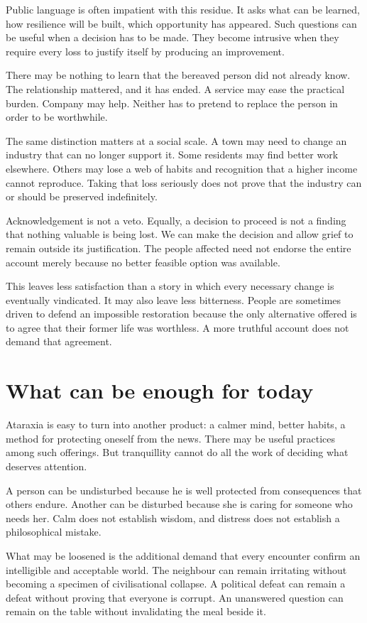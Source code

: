 \documentclass[12pt,a4paper]{book}
\begin{document}
Public language is often impatient with this residue. It asks what can be learned, how resilience will be built, which opportunity has appeared. Such questions can be useful when a decision has to be made. They become intrusive when they require every loss to justify itself by producing an improvement.

There may be nothing to learn that the bereaved person did not already know. The relationship mattered, and it has ended. A service may ease the practical burden. Company may help. Neither has to pretend to replace the person in order to be worthwhile.

The same distinction matters at a social scale. A town may need to change an industry that can no longer support it. Some residents may find better work elsewhere. Others may lose a web of habits and recognition that a higher income cannot reproduce. Taking that loss seriously does not prove that the industry can or should be preserved indefinitely.

Acknowledgement is not a veto. Equally, a decision to proceed is not a finding that nothing valuable is being lost. We can make the decision and allow grief to remain outside its justification. The people affected need not endorse the entire account merely because no better feasible option was available.

This leaves less satisfaction than a story in which every necessary change is eventually vindicated. It may also leave less bitterness. People are sometimes driven to defend an impossible restoration because the only alternative offered is to agree that their former life was worthless. A more truthful account does not demand that agreement.

\section*{What can be enough for today}

Ataraxia is easy to turn into another product: a calmer mind, better habits, a method for protecting oneself from the news. There may be useful practices among such offerings. But tranquillity cannot do all the work of deciding what deserves attention.

A person can be undisturbed because he is well protected from consequences that others endure. Another can be disturbed because she is caring for someone who needs her. Calm does not establish wisdom, and distress does not establish a philosophical mistake.

What may be loosened is the additional demand that every encounter confirm an intelligible and acceptable world. The neighbour can remain irritating without becoming a specimen of civilisational collapse. A political defeat can remain a defeat without proving that everyone is corrupt. An unanswered question can remain on the table without invalidating the meal beside it.
\end{document}
